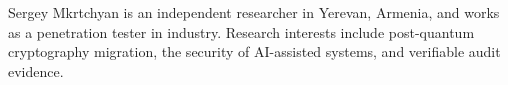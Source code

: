 \begin{IEEEbiographynophoto}{Sergey Mkrtchyan}
is an independent researcher in Yerevan, Armenia, and works as a penetration tester in industry. Research interests include post-quantum cryptography migration, the security of AI-assisted systems, and verifiable audit evidence.
\end{IEEEbiographynophoto}
